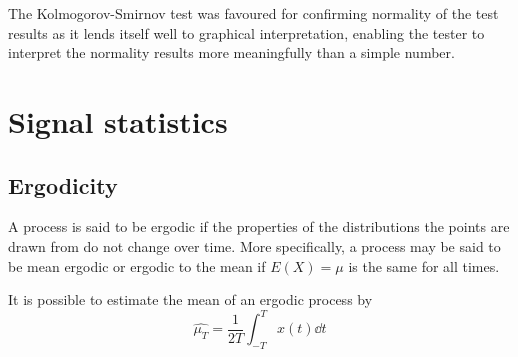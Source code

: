 The Kolmogorov-Smirnov test was favoured for confirming normality of the test results as it lends itself well to graphical interpretation, enabling the tester to interpret the normality results more meaningfully than a simple number.

\section{Signal statistics}

\subsection{Ergodicity}
A process is said to be ergodic if the properties of the distributions the points are drawn from do not change over time.  
More specifically, a process may be said to be mean ergodic or ergodic to the mean if $E(X)=\mu$ is the same for all times.

It is possible to estimate the mean of an ergodic process by 
\begin{equation}
  \hat{\mu_T} = \frac{1}{2T} \int_{-T}^{T} x(t) \dd t
\end{equation}



